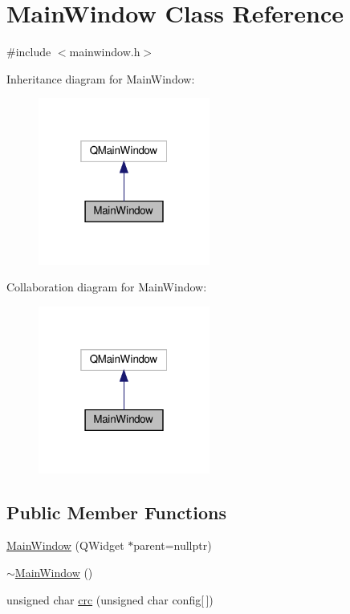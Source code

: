 \hypertarget{class_main_window}{}\section{Main\+Window Class Reference}
\label{class_main_window}


{\ttfamily \#include $<$mainwindow.\+h$>$}



Inheritance diagram for Main\+Window\+:
\nopagebreak
\begin{figure}[H]
\begin{center}
\leavevmode
\includegraphics[width=160pt]{de/d4b/class_main_window__inherit__graph}
\end{center}
\end{figure}


Collaboration diagram for Main\+Window\+:
\nopagebreak
\begin{figure}[H]
\begin{center}
\leavevmode
\includegraphics[width=160pt]{d0/db8/class_main_window__coll__graph}
\end{center}
\end{figure}
\subsection*{Public Member Functions}
\begin{DoxyCompactItemize}
\item 
\hyperlink{class_main_window_a996c5a2b6f77944776856f08ec30858d}{Main\+Window} (Q\+Widget $\ast$parent=nullptr)
\item 
\hyperlink{class_main_window_ae98d00a93bc118200eeef9f9bba1dba7}{$\sim$\+Main\+Window} ()
\item 
unsigned char \hyperlink{class_main_window_a86ded1599e8f511ce500bb7a03a5aaf8}{crc} (unsigned char config\mbox{[}$\,$\mbox{]})
\end{DoxyCompactItemize}


